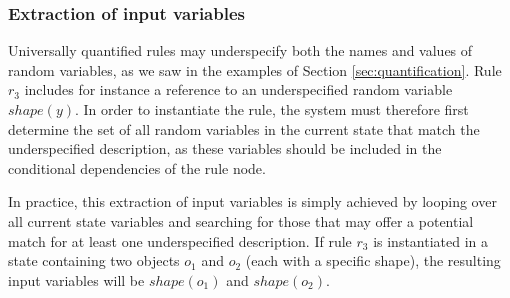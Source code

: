 \subsubsection*{Extraction of input variables}

Universally quantified rules may underspecify both the names and values of random variables, as we saw in the examples of Section \ref{sec:quantification}.  Rule $r_3$ includes for instance a reference to an underspecified random variable $\mathit{shape}(y)$.  In order to instantiate the rule, the system must therefore first determine the set of all random variables in the current state that match the underspecified description, as these variables should be included in the conditional dependencies of the rule node. 

In practice, this extraction of input variables is simply achieved by looping over all current state variables and searching for those that may offer a potential match for at least one underspecified description. If rule $r_3$ is instantiated in a state containing two objects $o_1$ and $o_2$ (each with a specific shape), the resulting input variables will be $\mathit{shape}(o_1)$ and $\mathit{shape}(o_2)$. 



